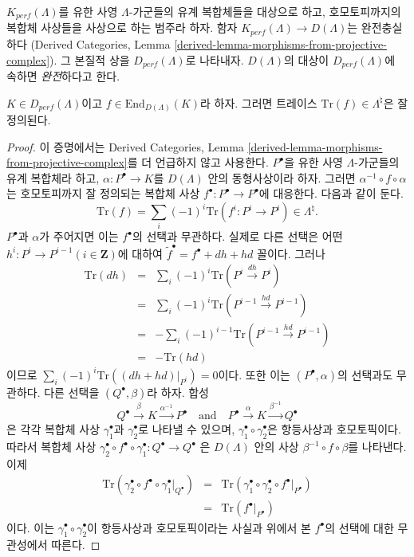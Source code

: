 \begin{definition}
\label{definition-perfect}
$K_{perf}(\Lambda)$를 유한 사영 $\Lambda$-가군들의 유계 복합체들을
대상으로 하고, 호모토피까지의 복합체 사상들을 사상으로 하는 범주라
하자. 함자 $K_{perf}(\Lambda)\to D(\Lambda)$는 완전충실하다
(Derived Categories, Lemma
\ref{derived-lemma-morphisms-from-projective-complex}). 그 본질적 상을
$D_{perf}(\Lambda)$로 나타내자. $D(\Lambda)$의 대상이
$D_{perf}(\Lambda)$에 속하면 {\it 완전}하다고 한다.
\end{definition}

\begin{proposition}
\label{proposition-trace-well-defined}
$K\in D_{perf}(\Lambda)$이고
$f\in \text{End}_{D(\Lambda)}(K)$라 하자. 그러면 트레이스
$\text{Tr}(f)\in \Lambda^\natural$은 잘 정의된다.
\end{proposition}

\begin{proof}
이 증명에서는 Derived Categories, Lemma
\ref{derived-lemma-morphisms-from-projective-complex}를 더 언급하지 않고
사용한다. $P^\bullet$을 유한 사영 $\Lambda$-가군들의 유계 복합체라 하고,
$\alpha : P^\bullet \to K$를 $D(\Lambda)$ 안의 동형사상이라 하자. 그러면
$\alpha^{-1}\circ f\circ \alpha$는 호모토피까지 잘 정의되는 복합체 사상
$f^\bullet : P^\bullet \to P^\bullet$에 대응한다. 다음과 같이 둔다.
$$
\text{Tr}(f) = \sum_i (-1)^i \text{Tr}(f^i : P^i \to P^i) \in \Lambda^\natural.
$$
$P^\bullet$과 $\alpha$가 주어지면 이는 $f^\bullet$의 선택과 무관하다.
실제로 다른 선택은 어떤
$h^i : P^i \to P^{i-1}(i\in \mathbf{Z})$에 대하여
$\tilde{f}^\bullet = f^\bullet + dh +hd$ 꼴이다. 그러나
\begin{eqnarray*}
\text{Tr}(dh) & = & \sum_i (-1)^i \text{Tr}(P^i\xrightarrow{dh} P^i) \\
& = & \sum_i (-1)^i \text{Tr}(P^{i-1}\xrightarrow{hd} P^{i-1}) \\
& = & -\sum_i (-1)^{i-1}\text{Tr}(P^{i-1}\xrightarrow{hd} P^{i-1}) \\
& = & - \text{Tr}(hd)
\end{eqnarray*}
이므로 $\sum_i (-1)^i \text{Tr} ((dh+hd)|_{P^i})=0$이다.
또한 이는 $(P^\bullet , \alpha)$의 선택과도 무관하다. 다른 선택을
$(Q^\bullet, \beta)$라 하자. 합성
$$
Q^\bullet \xrightarrow{\beta} K \xrightarrow{\alpha^{-1}} P^\bullet
\quad\text{and}\quad
P^\bullet \xrightarrow{\alpha} K \xrightarrow{\beta^{-1}} Q^\bullet
$$
은 각각 복합체 사상 $\gamma_1^\bullet$과 $\gamma_2^\bullet$로 나타낼 수
있으며, $\gamma_1^\bullet \circ \gamma_2^\bullet$은 항등사상과
호모토픽이다. 따라서 복합체 사상
$\gamma_2^\bullet\circ f^\bullet\circ \gamma_1^\bullet : Q^\bullet\to Q^\bullet$
은 $D(\Lambda)$ 안의 사상 $\beta^{-1}\circ f\circ\beta$를 나타낸다. 이제
\begin{eqnarray*}
\text{Tr}(\gamma_2^\bullet\circ f^\bullet\circ\gamma_1^\bullet|_{Q^\bullet}) &
= & \text{Tr}(\gamma_1^\bullet \circ\gamma_2^\bullet \circ
f^\bullet|_{P^\bullet})\\
& = & \text{Tr}(f^\bullet|_{P^\bullet})
\end{eqnarray*}
이다. 이는 $\gamma_1^\bullet \circ \gamma_2^\bullet$이 항등사상과
호모토픽이라는 사실과 위에서 본 $f^\bullet$의 선택에 대한 무관성에서
따른다.
\end{proof}




